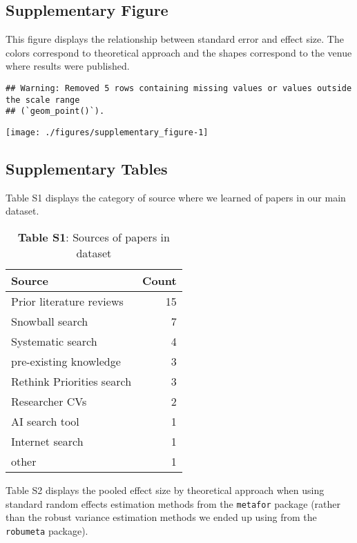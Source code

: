 \documentclass[sn-nature,pdflatex]{sn-jnl}
\begin{document}
\subsection{Supplementary Figure}\label{supplementary-figure}

This figure displays the relationship between standard error and effect
size. The colors correspond to theoretical approach and the shapes
correspond to the venue where results were published.

\begin{verbatim}
## Warning: Removed 5 rows containing missing values or values outside the scale range
## (`geom_point()`).
\end{verbatim}

\texttt{[image: ./figures/supplementary\_figure-1]}

\subsection{Supplementary Tables}\label{supplementary-tables}

Table S1 displays the category of source where we learned of papers in
our main dataset. \captionsetup[table]{labelformat=empty}

\begin{table}[!h]
\centering
\caption{\label{tab:supp_table_one}\textbf{Table S1}: Sources of papers in dataset}
\centering
\begin{tabular}[t]{lr}
\toprule
Source & Count\\
\midrule
Prior literature reviews & 15\\
Snowball search & 7\\
Systematic search & 4\\
pre-existing knowledge & 3\\
Rethink Priorities search & 3\\
\addlinespace
Researcher CVs & 2\\
AI search tool & 1\\
Internet search & 1\\
other & 1\\
\bottomrule
\end{tabular}
\end{table}

Table S2 displays the pooled effect size by theoretical approach when
using standard random effects estimation methods from the
\texttt{metafor} package (rather than the robust variance estimation
methods we ended up using from the \texttt{robumeta} package).
\end{document}
